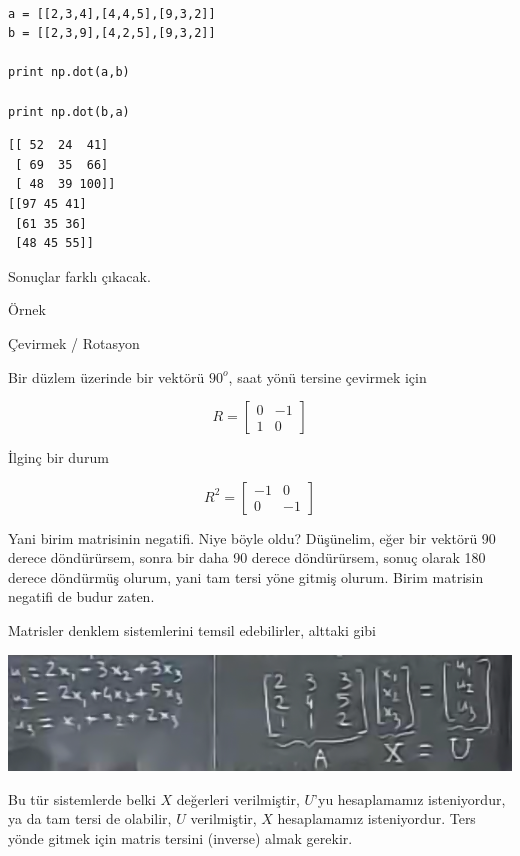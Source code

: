 \documentclass[12pt,fleqn]{article}\usepackage{../../common}
\begin{document}
\begin{verbatim}

a = [[2,3,4],[4,4,5],[9,3,2]]
b = [[2,3,9],[4,2,5],[9,3,2]]

print np.dot(a,b)

print np.dot(b,a)
\end{verbatim}

\begin{verbatim}
[[ 52  24  41]
 [ 69  35  66]
 [ 48  39 100]]
[[97 45 41]
 [61 35 36]
 [48 45 55]]
\end{verbatim}

Sonuçlar farklı çıkacak. 

Örnek

Çevirmek / Rotasyon

Bir düzlem üzerinde bir vektörü $90^o$, saat yönü tersine çevirmek için 

$$ R =
\left[\begin{array}{rr}
0 & -1 \\
1 & 0
\end{array}\right]
 $$

İlginç bir durum

$$ R^2 =
\left[\begin{array}{rr}
-1 & 0 \\
0 & -1
\end{array}\right]
 $$

Yani birim matrisinin negatifi. Niye böyle oldu? Düşünelim, eğer
bir vektörü 90 derece döndürürsem, sonra bir daha 90 derece döndürürsem, sonuç 
olarak 180 derece döndürmüş olurum, yani tam tersi yöne gitmiş olurum. Birim 
matrisin negatifi de budur zaten. 

Matrisler denklem sistemlerini temsil edebilirler, alttaki gibi

\begin{center}


\includegraphics[width=14.9cm]{3_5.png}


\end{center}

Bu tür sistemlerde belki $X$ değerleri verilmiştir, $U$'yu hesaplamamız
isteniyordur, ya da tam tersi de olabilir, $U$ verilmiştir, $X$
hesaplamamız isteniyordur. Ters yönde gitmek için matris tersini (inverse)
almak gerekir.
\end{document}
